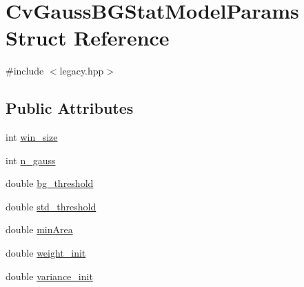 \hypertarget{structCvGaussBGStatModelParams}{\section{Cv\-Gauss\-B\-G\-Stat\-Model\-Params Struct Reference}
\label{structCvGaussBGStatModelParams}
}


{\ttfamily \#include $<$legacy.\-hpp$>$}

\subsection*{Public Attributes}
\begin{DoxyCompactItemize}
\item 
int \hyperlink{structCvGaussBGStatModelParams_a40244648987b33f71423b21f9a07c319}{win\-\_\-size}
\item 
int \hyperlink{structCvGaussBGStatModelParams_aaf2c2567410866de4b696b453df74d13}{n\-\_\-gauss}
\item 
double \hyperlink{structCvGaussBGStatModelParams_a1648daffc44d76d0416fe08aba4f7ce8}{bg\-\_\-threshold}
\item 
double \hyperlink{structCvGaussBGStatModelParams_a3f9d9737046dfd6fb5e468f8b65ab6cd}{std\-\_\-threshold}
\item 
double \hyperlink{structCvGaussBGStatModelParams_a2bfb1edae6d5be69a867217c72b2a009}{min\-Area}
\item 
double \hyperlink{structCvGaussBGStatModelParams_a20ecf912155074c1c9f3c8bf1a756fc4}{weight\-\_\-init}
\item 
double \hyperlink{structCvGaussBGStatModelParams_af81821c18f94ae3fe2c1872cda910d4a}{variance\-\_\-init}
\end{DoxyCompactItemize}


